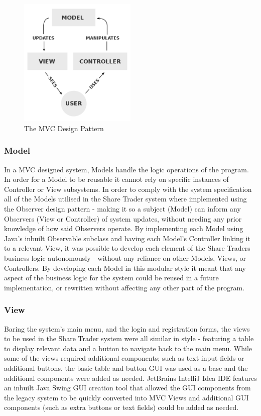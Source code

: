\documentclass[12pt, a4paper,titlepage]{article}
\begin{document}
\begin{figure}[h]
    \begin{center}
        \includegraphics[width = 0.5\textwidth]{./res/mvc.png}
        \caption[The MVC Design Pattern]{The MVC Design Pattern 
        \footnotemark} 
        \label{fig_mvc}
    \end{center}
\end{figure}

\subsubsection{Model}
In a MVC designed system, Models handle the logic operations of the program.
In order for a Model to be reusable it cannot rely on specific instances of
Controller or View subsystems. 
In order to comply with the system specification all of the Models utilised in
the Share Trader system where implemented using the Observer design pattern -
making it so a subject (Model) can inform any Observers (View or Controller)
of system updates, without needing any prior knowledge of how said Observers
operate.  
By implementing each Model using Java’s inbuilt Observable subclass and having
each Model’s Controller linking it to a relevant View, it was possible to
develop each element of the Share Traders business logic autonomously -
without any reliance on other Models, Views, or Controllers.
By developing each Model in this modular style it meant that any aspect of the
business logic for the system could be reused in a future implementation, or
rewritten without affecting any other part of the program.

\subsubsection{View}
Baring the system's main menu, and the login and registration forms, the views
to be used in the Share Trader system were all similar in style - featuring a
table to display relevant data and a button to navigate back to the main menu.
While some of the views required additional components; such as text input
fields or additional buttons, the basic table and button GUI was used as a
base and the additional components were added as needed.  
JetBrains IntelliJ Idea IDE features an inbuilt Java Swing GUI creation tool
that allowed the GUI components from the legacy system to be quickly converted
into MVC Views and additional GUI components (such as extra buttons or text
fields) could be added as needed.
\end{document}
